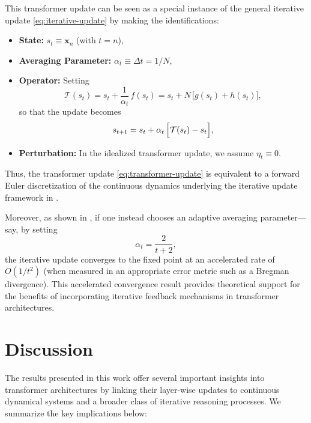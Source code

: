 This transformer update can be seen as a special instance of the general iterative update \eqref{eq:iterative-update} by making the identifications:
\begin{itemize}[leftmargin=2em]
    \item \textbf{State:} \(s_t \equiv \mathbf{x}_n\) (with \(t = n\)),
    \item \textbf{Averaging Parameter:} \(\alpha_t \equiv \Delta t = 1/N\),
    \item \textbf{Operator:} Setting
    \[
    \mathcal{T}(s_t) = s_t + \frac{1}{\alpha_t}\, f(s_t) = s_t + N\, \bigl[g(s_t) + h(s_t)\bigr],
    \]
    so that the update becomes
    \[
    s_{t+1} = s_t + \alpha_t\,\Bigl[\mathcal{T}(s_t) - s_t\Bigr],
    \]
    \item \textbf{Perturbation:} In the idealized transformer update, we assume \(\eta_t \equiv 0\).
\end{itemize}

Thus, the transformer update \eqref{eq:transformer-update} is equivalent to a forward Euler discretization of the continuous dynamics underlying the iterative update framework in \cite{feinashley2025iterate}. 

Moreover, as shown in \cite{feinashley2025iterate}, if one instead chooses an adaptive averaging parameter—say, by setting
\[
\alpha_t = \frac{2}{t+2},
\]
the iterative update converges to the fixed point at an accelerated rate of \(O(1/t^2)\) (when measured in an appropriate error metric such as a Bregman divergence). This accelerated convergence result provides theoretical support for the benefits of incorporating iterative feedback mechanisms in transformer architectures.






\section{Discussion}

The results presented in this work offer several important insights into transformer architectures by linking their layer-wise updates to continuous dynamical systems and a broader class of iterative reasoning processes. We summarize the key implications below:

